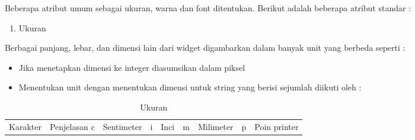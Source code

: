\documentclass [12pt,a4paper,notitlepage,oneside,bahasa]{article}
\begin{document}


\vspace{12pt}
\noindent 
 \hspace*{0.5in} Beberapa atribut umum sebagai ukuran, warna dan font ditentukan. Berikut adalah beberapa atribut standar : \par
\noindent 
\begin{enumerate}
\item Ukuran \par
\noindent 
\end{enumerate}
Berbagai panjang, lebar, dan dimensi lain dari widget digambarkan dalam banyak unit yang berbeda seperti : \par
\noindent 
\begin{itemize}
\item Jika menetapkan dimensi ke integer diasumsikan dalam piksel \par
\noindent 
\item Menentukan unit dengan menentukan dimensi untuk string yang berisi sejumlah diikuti oleh :\end{itemize}
 \par




\begin{table}[ht]
	\caption{Ukuran}
	\begin{tabular*}{\textwidth}{@{\extracolsep{\fill}}lcc}
		\hline
		Karakter&  Penjelasan \cr
		\hline
		c&Sentimeter&\cr
		i&Inci&\cr
		m&Milimeter&\cr
		p&Poin printer\cr
		\hline
	\end{tabular*}
	\begin{tablenotes}
	\end{tablenotes}
\end{table}


\end{document}
